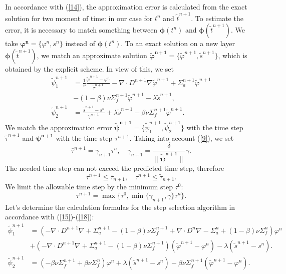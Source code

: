 \documentclass[runningheads]{llncs}
\begin{document}
In accordance with (\ref{14}), the approximation error is calculated from the exact solution for two moment of time: in our case for $t^n$ and $\widetilde{t}^{n+1}$.
To estimate the error, it is necessary to match something between $\bm{\phi}(t^n)$ and $\bm{\phi}(\widetilde{t}^{n+1})$.  We take $\bm{\varphi^n} = \{\varphi^n, s^n\}$ instead of $\bm{\phi}(t^n)$. To an exact solution on a new layer $\bm{\phi}(\widetilde{t}^{n+1})$, we match an approximate solution $\bm{\widetilde{\varphi}^{n+1}} = \{\widetilde{\varphi}^{n+1}, \widetilde{s}^{n+1}\}$, which is obtained by the explicit scheme. In view of this, we set
\begin{equation}\label{16}
\begin{split}
\widetilde\psi^{n+1}_1  & =  \frac{1}{v} \frac{\widetilde\varphi^{n+1}-\varphi^n}{\widetilde\tau^{n+1}} - \nabla \cdot D^{n+1} \nabla \widetilde\varphi^{n+1} + \Sigma_{a}^{n+1} \widetilde\varphi^{n+1} \\
&- (1-\beta) \nu \Sigma^{n+1}_{f} \widetilde\varphi^{n+1} - \lambda \widetilde s^{n+1}, \\
\widetilde\psi^{n+1}_2  & =  \frac{\widetilde s^{n+1}-s^n}{\widetilde\tau^{n+1}} + \lambda \widetilde s^{n+1} - \beta \nu\Sigma_{f}^{n+1} \widetilde\varphi^{n+1}.
\end{split}
\end{equation} 
We match the approximation error $\bm{\widetilde{\psi}^{n+1} }= \{\widetilde{\psi}^{n+1}_1, \widetilde{\psi}^{n+1}_2\}$ with the time step $\widetilde{\tau}^{n+1}$ and $\bm{\psi^{n+1}}$ with the time step $\tau^{n+1}$.
Taking into account (\ref{9}), we set
\begin{equation}\label{17}
  \bar{\tau}^{n+1} = \gamma_{n+1} \tau^n,
  \quad \gamma_{n+1} = \frac{\delta}{\| \bm{\widetilde{\psi}^{n+1}}\|}  \gamma.
\end{equation} 
The needed time step can not exceed the predicted time step, therefore
\[
\tau^{n+1} \leq \bar{\tau}_{n+1}, \quad \tau^{n+1} \leq \widetilde{\tau}_{n+1}.
\] 
We limit the allowable time step by the minimum step $\tau^0$:
\begin{equation}\label{18}
 \tau^{n+1} = \max \big \{\tau^0, \min \{\gamma_{n+1}, \gamma \} \tau^n \big \}. 
\end{equation}
Let's determine  the calculation formulas for the step selection algorithm in accordance with (\ref{15})-(\ref{18}):
\[
 \begin{split}
 \widetilde{\psi}^{n+1}_1  &  =  (- \nabla \cdot D^{n+1} \nabla  + \Sigma_{a}^{n+1}  - (1-\beta) \nu \Sigma^{n+1}_{f}  + \nabla \cdot D^n \nabla - \Sigma^n_{a} + (1-\beta) \nu \Sigma^n_{f}) \varphi^{n} \\
& + (- \nabla \cdot D^{n+1} \nabla  + \Sigma_{a}^{n+1}  - (1-\beta) \nu \Sigma^{n+1}_{f}) (\widetilde{\varphi}^{n+1} - \varphi^n) - \lambda (\widetilde{s}^{n+1} - s^n).\\
 \widetilde{\psi}^{n+1}_2 &  =   (-\beta\nu\Sigma^{n+1}_f + \beta\nu\Sigma^{n}_f)\varphi^n + \lambda (\widetilde s^{n+1} - s^n) - \beta\nu\Sigma^{n+1}_f (\widetilde\varphi^{n+1} - \varphi^n) .
 \end{split} 
\] 
\end{document}
